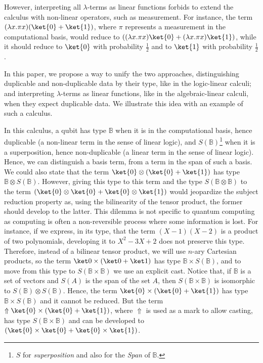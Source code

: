 \documentclass[preprint]{elsarticle}
\newcommand\B{\ensuremath{\mathbb B}}
\newcommand\pair[2]{({#1}+{#2})}
\begin{document}
However, interpreting all $\lambda$-terms as linear functions forbids to extend
the calculus with non-linear operators, such as measurement. For instance, the
term $(\lambda x.\pi x)\pair{\ket{0}}{\ket{1}}$, where $\pi$ represents a
measurement in the computational basis, would reduce to $\pair{(\lambda x.\pi x)
  \ket{0}}{(\lambda x.\pi x) \ket{1}}$, while it should reduce to $\ket{0}$ with
probability $\frac{1}{2}$ and to $\ket{1}$ with probability $\frac{1}{2}$.

In this paper, we propose a way to unify the two approaches, distinguishing
duplicable and non-duplicable data by their type, like in the logic-linear
calculi; and interpreting $\lambda$-terms as linear functions, like in the
algebraic-linear calculi, when they expect duplicable data. We illustrate this
idea with an example of such a calculus.

In this calculus, a qubit has type $\B$ when it is in the computational basis,
hence duplicable (a non-linear term in the sense of linear logic), and
$S(\B)$\footnote{$S$ for \emph{superposition} and also for the \emph{Span} of
  $\B$.} when it is a superposition, hence non-duplicable (a linear term in the
sense of linear logic). Hence, we can distinguish a basis term, from a term in
the span of such a basis. We could also state that the term $\ket{0}
\otimes\pair{\ket{0}}{\ket{1}}$ has type $\B\otimes S(\B)$. However, giving this
type to this term and the type $S(\B\otimes\B)$ to the term $\pair{\ket{0}
  \otimes \ket{0}}{\ket{0} \otimes \ket{1}}$ would jeopardize the subject
reduction property as, using the bilinearity of the tensor product, the former
should develop to the latter. This dilemma is not specific to quantum computing
as computing is often a non-reversible process where some information is lost.
For instance, if we express, in its type, that the term $(X - 1)(X - 2)$ is a
product of two polynomials, developing it to $X^2 - 3X + 2$ does not preserve
this type. Therefore, instead of a bilinear tensor product, we will use $n$-ary
Cartesian products, so the term $\ket 0\times\pair{\ket 0}{\ket 1}$ has type
$\B\times S(\B)$, and to move from this type to $S(\B\times\B)$ we use an
explicit cast. Notice that, if $\B$ is a set of vectors and $S(A)$ is the span
of the set $A$, then $S(\B\times\B)$ is isomorphic to $S(\B)\otimes S(\B)$.
Hence, the term $\ket{0}\times\pair{\ket{0}}{\ket{1}}$ has type $\B\times S(\B)$
and it cannot be reduced. But the term $\Uparrow
\ket{0}\times\pair{\ket{0}}{\ket{1}}$, where $\Uparrow$ is used as a mark to allow casting, has type $S(\B\times\B)$ and can be developed
to $\pair{\ket{0}\times\ket{0}}{\ket{0}\times\ket{1}}$.
\end{document}
